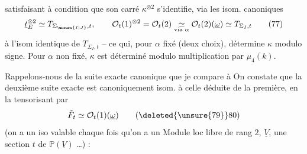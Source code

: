 satisfaisant à  condition que son carré $\kappa^{\otimes2}$ s'identifie, via les isom. canoniques
\[
 \underline{t}_E^{\otimes2}\simeq T_{\Sigma_{\unsure{I|J}},t},\qquad
 \mathcal O_t(1)^{\otimes2}=\mathcal O_t(2)\underset{\text{via }\alpha}{\simeq}
 \mathcal O_t(2)(\underline\omega)\simeq T_{\Sigma_I,t} \tag*{(77)}
\]
à l'isom identique de $T_{\Sigma_I,t}$ -- ce qui, pour $\alpha$ fixé (deux choix), détermine $\kappa$ modulo signe. Pour $\alpha$ non fixé, $\kappa$ est déterminé modulo multiplication par $\mu_4(k)$.

Rappelons-nous de la suite exacte canonique
que  je compare à
On constate que la deuxième suite exacte est canoniquement isom. à celle déduite de la première, en la tensorisant par
\[
 \check F_t\simeq\mathcal O_t(1)(\underline\omega) \tag*{(\deleted{\unsure{79}}80)}
\]
(on a un iso valable chaque fois qu'on a un Module loc libre de rang $2$, $\underline V$,   une section $t$ de $\mathbb P(\underline V)$ \ldots) :
